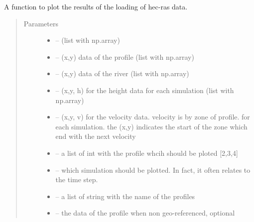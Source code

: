 \documentclass[letterpaper,10pt,english]{sphinxmanual}
\begin{document}

\begin{fulllineitems}
\label{\detokenize{index:src.Hec_ras06.figure_xml}}
A function to plot the results of the loading of hec-ras data.
\begin{quote}\begin{description}
\item[{Parameters}] \leavevmode\begin{itemize}
\item {} 
 -- (list with np.array)

\item {} 
 -- (x,y) data of the profile (list with np.array)

\item {} 
 -- (x,y) data of the river (list with np.array)

\item {} 
 -- (x,y, h) for the height data for each simulation (list with np.array)

\item {} 
 -- (x,y, v) for the velocity data. velocity is by zone of profile. for each simulation.
the (x,y) indicates the start of the zone which end with the next velocity

\item {} 
 -- a list of int with the profile whcih should be ploted {[}2,3,4{]}

\item {} 
 -- which simulation should be plotted. In fact, it often relates to the time step.

\item {} 
 -- a list of string with the name of the profiles

\item {} 
 -- the data of the profile when non geo-referenced, optional


\end{itemize}
\end{description}
\end{quote}
\end{fulllineitems}
\end{document}
